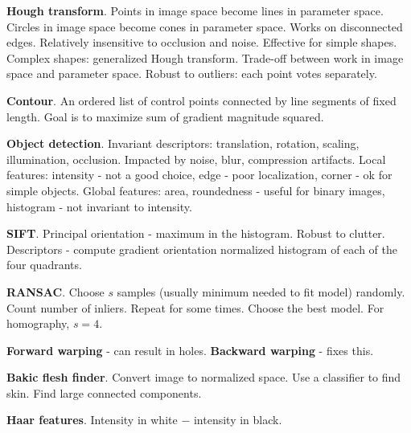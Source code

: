 \documentclass[twocolumn]{zett}
\begin{document}
\begin{node}
  \textbf{Hough transform}.
  Points in image space become lines in parameter space.
  Circles in image space become cones in parameter space.
  Works on disconnected edges.
  Relatively insensitive to occlusion and noise.
  Effective for simple shapes.
  Complex shapes: generalized Hough transform.
  Trade-off between work in image space and parameter space.
  Robust to outliers: each point votes separately.
\end{node}

\begin{node}
  \textbf{Contour}.
  An ordered list of control points connected by line segments of fixed length.
  Goal is to maximize sum of gradient magnitude squared.
\end{node}

\begin{node}
  \textbf{Object detection}.
  Invariant descriptors: translation, rotation, scaling, illumination, occlusion.
  Impacted by noise, blur, compression artifacts.
  Local features: intensity - not a good choice, edge - poor localization, corner - ok for simple objects.
  Global features: area, roundedness - useful for binary images, histogram - not invariant to intensity.
\end{node}

\begin{node}
  \textbf{SIFT}.
  Principal orientation - maximum in the histogram.
  Robust to clutter.
  Descriptors - compute gradient orientation normalized histogram of each of the four quadrants.
\end{node}

\begin{node}
  \textbf{RANSAC}.
  Choose $s$ samples (usually minimum needed to fit model) randomly.
  Count number of inliers.
  Repeat for some times.
  Choose the best model.
  For homography, $s = 4$.
\end{node}

\begin{node}
  \textbf{Forward warping} - can result in holes.
  \textbf{Backward warping} - fixes this.
\end{node}

\begin{node}
  \textbf{Bakic flesh finder}.
  Convert image to normalized space.
  Use a classifier to find skin.
  Find large connected components.
\end{node}

\begin{node}
  \textbf{Haar features}.
  Intensity in white $-$ intensity in black.
\end{node}
\end{document}
